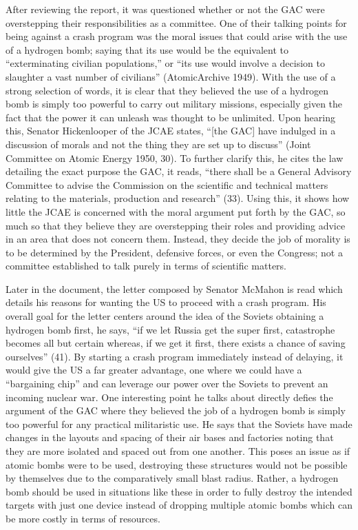 \documentclass[12pt]{turabian-researchpaper}
\begin{document}
After reviewing the report, it was questioned whether or not the GAC were overstepping their responsibilities as a committee. One of their talking points for being against a crash program was the moral issues that could arise with the use of a hydrogen bomb; saying that its use would be the equivalent to “exterminating civilian populations,” or “its use would involve a decision to slaughter a vast number of civilians” (AtomicArchive 1949). With the use of a strong selection of words, it is clear that they believed the use of a hydrogen bomb is simply too powerful to carry out military missions, especially given the fact that the power it can unleash was thought to be unlimited. Upon hearing this, Senator Hickenlooper of the JCAE states, “[the GAC] have indulged in a discussion of morals and not the thing they are set up to discuss” (Joint Committee on Atomic Energy 1950, 30). To further clarify this, he cites the law detailing the exact purpose the GAC, it reads, “there shall be a General Advisory Committee to advise the Commission on the scientific and technical matters relating to the materials, production and research” (33). Using this, it shows how little the JCAE is concerned with the moral argument put forth by the GAC, so much so that they believe they are overstepping their roles and providing advice in an area that does not concern them. Instead, they decide the job of morality is to be determined by the President, defensive forces, or even the Congress; not a committee established to talk purely in terms of scientific matters.

Later in the document, the letter composed by Senator McMahon is read which details his reasons for wanting the US to proceed with a crash program. His overall goal for the letter centers around the idea of the Soviets obtaining a hydrogen bomb first, he says, “if we let Russia get the super first, catastrophe becomes all but certain whereas, if we get it first, there exists a chance of saving ourselves” (41). By starting a crash program immediately instead of delaying, it would give the US a far greater advantage, one where we could have a “bargaining chip” and can leverage our power over the Soviets to prevent an incoming nuclear war. One interesting point he talks about directly defies the argument of the GAC where they believed the job of a hydrogen bomb is simply too powerful for any practical militaristic use. He says that the Soviets have made changes in the layouts and spacing of their air bases and factories noting that they are more isolated and spaced out from one another. This poses an issue as if atomic bombs were to be used, destroying these structures would not be possible by themselves due to the comparatively small blast radius. Rather, a hydrogen bomb should be used in situations like these in order to fully destroy the intended targets with just one device instead of dropping multiple atomic bombs which can be more costly in terms of resources.
\end{document}
